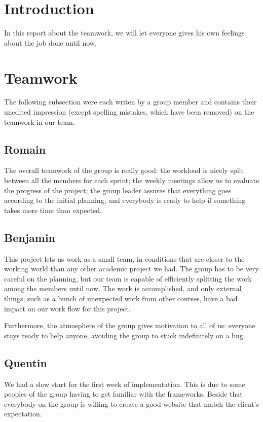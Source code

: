 \section{Introduction}

In this report about the teamwork, we will let everyone gives his own
feelings about the job done until now.

\section{Teamwork}

The following subsection were each writen by a group member and contains their unedited impression (except spelling mistakes, which have been removed) on the teamwork in our team. \newline

\subsection{Romain}
The overall teamwork of the group is really good: the workload is nicely
split between all the members for each sprint; the weekly meetings allow
us to evaluate the progress of the project; the group leader assures that
everything goes according to the initial planning, and everybody is ready to
help if something takes more time than expected. \newline

\subsection{Benjamin}

This project lets us work as a small team, in conditions that are closer to
the working world than any other academic project we had. The group has to
be very careful on the planning, but our team is capable of efficiently
splitting the work among the members until now. The work is accomplished,
and only external things, such as a bunch of unexpected work from other
courses, have a bad impact on our work flow for this project. \newline

Furthermore, the atmosphere of the group gives motivation to all of us:
everyone stays ready to help anyone, avoiding the group to stuck
indefinitely on a bug.

\subsection{Quentin}
We had a slow start for the first week of implementation. This is due to
some peoples of the group having to get familiar with the frameworks.
Beside that everybody on the group is willing to create a good website that
match the client's expectation. \newline

